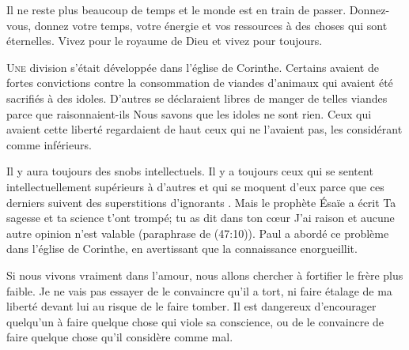 Il ne reste plus beaucoup de temps et le monde est en train de passer.
 Donnez-vous, donnez votre temps, votre énergie et vos ressources
 à des choses qui sont éternelles.
 Vivez pour le royaume de Dieu et vivez pour toujours.

\dvrule








\lettrine{U}{ne} division s'était développée dans l'église de Corinthe.
 Certains avaient de fortes convictions
 contre la consommation de viandes d'animaux
 qui avaient été sacrifiés à des idoles.
 D'autres se déclaraient libres de manger
 de telles viandes parce que \ocadr raisonnaient-ils \fcadr{}
 \Og Nous savons que les idoles ne sont rien. \Fg{}
 Ceux qui avaient cette liberté regardaient de haut
 ceux qui ne l'avaient pas, les considérant comme inférieurs.

Il y aura toujours des snobs intellectuels.
 Il y a toujours ceux qui se sentent intellectuellement
 supérieurs à d'autres et qui se moquent d'eux
 parce que ces derniers suivent \Og des superstitions d'ignorants \Fg{}.
 Mais le prophète Ésaïe a écrit\frcolon{} 
 \Og Ta sagesse et ta science t'ont trompé;
 tu as dit dans ton c\oe{}ur\frcolon{} 
 \Og J'ai raison et aucune autre opinion n'est valable \Fg{}
 (paraphrase de (47:10)).
 Paul a abordé ce problème dans l'église de Corinthe,
 en avertissant que \Og la connaissance enorgueillit. \Fg{}


Si nous vivons vraiment dans l'amour,
 nous allons chercher à fortifier le frère plus faible.
 Je ne vais pas essayer de le convaincre qu'il a tort,
 ni faire étalage de ma liberté devant lui
 au risque de le faire tomber.
 Il est dangereux d'encourager quelqu'un
 à faire quelque chose qui viole sa conscience,
 ou de le convaincre de faire quelque chose
 qu'il considère comme mal.

